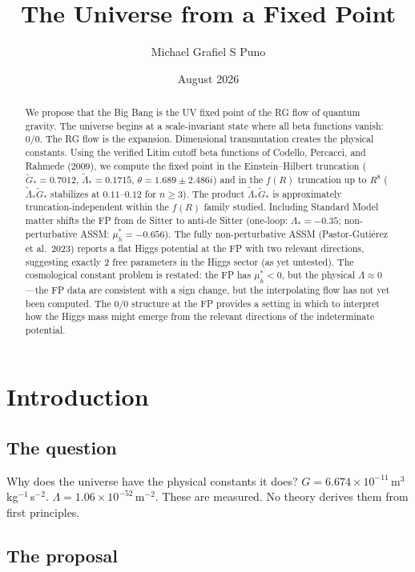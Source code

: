 \documentclass[12pt]{article}
\title{The Universe from a Fixed Point}
\author{Michael Grafiel S Puno}
\date{August 2026}
\begin{document}
\maketitle

\begin{abstract}
We propose that the Big Bang is the UV fixed point of the RG flow of quantum gravity. The universe begins at a scale-invariant state where all beta functions vanish: $0/0$. The RG flow is the expansion. Dimensional transmutation creates the physical constants. Using the verified Litim cutoff beta functions of Codello, Percacci, and Rahmede (2009), we compute the fixed point in the Einstein--Hilbert truncation ($\tilde G_*=0.7012$, $\tilde\Lambda_*=0.1715$, $\theta=1.689\pm2.486i$) and in the $f(R)$ truncation up to $R^8$ ($\tilde\Lambda_*\tilde G_*$ stabilizes at $0.11$--$0.12$ for $n\ge3$). The product $\tilde\Lambda_*\tilde G_*$ is approximately truncation-independent within the $f(R)$ family studied. Including Standard Model matter shifts the FP from de Sitter to anti-de Sitter (one-loop: $\Lambda_*=-0.35$; non-perturbative ASSM: $\mu^*_h=-0.656$). The fully non-perturbative ASSM (Pastor-Guti\'{e}rez et al.\ 2023) reports a flat Higgs potential at the FP with two relevant directions, suggesting exactly 2 free parameters in the Higgs sector (as yet untested). The cosmological constant problem is restated: the FP has $\mu^*_h<0$, but the physical $\Lambda\approx0$---the FP data are consistent with a sign change, but the interpolating flow has not yet been computed. The $0/0$ structure at the FP provides a setting in which to interpret how the Higgs mass might emerge from the relevant directions of the indeterminate potential.
\end{abstract}

\section{Introduction}

\subsection{The question}

Why does the universe have the physical constants it does? $G=6.674\times10^{-11}$\,m$^3$\,kg$^{-1}$\,s$^{-2}$. $\Lambda=1.06\times10^{-52}$\,m$^{-2}$. These are measured. No theory derives them from first principles.

\subsection{The proposal}
\end{document}
